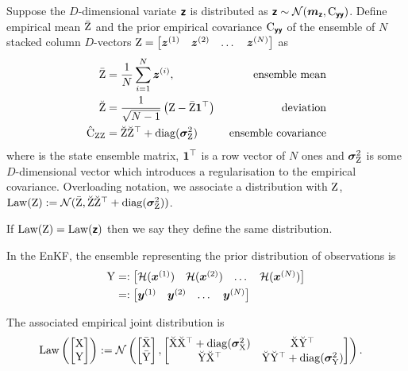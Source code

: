\documentclass{article}
\begin{document}
Suppose the $D$-dimensional variate $\boldsymbol{\mathsf{z}}$ is distributed as
$\boldsymbol{\mathsf{z}}\sim\mathcal{N}(\boldsymbol{m}_{\boldsymbol{\mathsf{z}}},\mathrm{C}_{\boldsymbol{\mathsf{yy}}})$.
Define empirical mean $\bar{\mathrm{Z}}$ and the prior empirical covariance $\mathrm{C}_{\boldsymbol{\mathsf{yy}}}$ of the ensemble of $N$ stacked column $D$-vectors  $\mathrm{Z} = \begin{bmatrix}\boldsymbol{z}^{(1)}& \boldsymbol{z}^{(2)}& \dots& \boldsymbol{z}^{(N)}\end{bmatrix}$ as
\begin{align}
    \bar{\mathrm{Z}} &= \frac{1}{N} \sum_{i=1}^N \boldsymbol{z}^{(i)}, \label{eq:ensemble_mean} & \text{ ensemble mean} \\
    \breve{\mathrm{Z}} &= \frac{1}{\sqrt{N-1}} \left( \mathrm{Z} - \bar{\mathrm{Z}} \boldsymbol{1}^\top \right) &\text{ deviation}  \label{eq:deviation_matrix} \\
    \hat{\mathrm{C}}_{\mathrm{ZZ}} &= \breve{\mathrm{Z}} \breve{\mathrm{Z}}^\top + \operatorname{diag}(\boldsymbol{\sigma}_{\mathrm{Z}}^2)&\text{ ensemble covariance}  \label{eq:ensemble-covariance}
\end{align}
where is the state ensemble matrix, $\boldsymbol{1}^\top$ is a row vector of $N$ ones and $\boldsymbol{\sigma}_{\mathrm{Z}}^2$ is some $D$-dimensional vector which introduces a regularisation to the empirical covariance.
Overloading notation, we associate a distribution with $\mathrm{Z}$,
$\operatorname{Law}(\mathrm{Z}) := \mathcal{N}(\bar{\mathrm{Z}}, \breve{\mathrm{Z}} \breve{\mathrm{Z}}^\top + \operatorname{diag}(\boldsymbol{\sigma}_{\mathrm{Z}}^2))$.

If $\operatorname{Law}(\mathrm{Z})=\operatorname{Law}(\boldsymbol{\mathsf{z}})$ then we say they define the same distribution.

In the EnKF, the ensemble representing the prior distribution of observations is
\begin{align}
    \mathrm{Y} &=: \begin{bmatrix}\mathcal{H}(\boldsymbol{x}^{(1)}) & \mathcal{H}(\boldsymbol{x}^{(2)})& \dots& \mathcal{H}(\boldsymbol{x}^{(N)})\end{bmatrix}\\
    &=: \begin{bmatrix}\boldsymbol{y}^{(1)}& \boldsymbol{y}^{(2)}& \dots& \boldsymbol{y}^{(N)}\end{bmatrix}
\end{align}


The associated empirical joint distribution is
\begin{align}
    \operatorname{Law}\left(\begin{bmatrix}
        \mathrm{X}\\
        \mathrm{Y}
    \end{bmatrix}\right) &:= \mathcal{N}\left(\begin{bmatrix}
        \bar{\mathrm{X}}\\
        \bar{\mathrm{Y}}
    \end{bmatrix},
    \begin{bmatrix}
        \breve{\mathrm{X}} \breve{\mathrm{X}}^\top + \operatorname{diag}(\boldsymbol{\sigma}_{\mathrm{X}}^2) & \breve{\mathrm{X}} \breve{\mathrm{Y}}^\top \\
        \breve{\mathrm{Y}} \breve{\mathrm{X}}^\top  & \breve{\mathrm{Y}} \breve{\mathrm{Y}}^\top + \operatorname{diag}(\boldsymbol{\sigma}_{\mathrm{Y}}^2)
    \end{bmatrix}
    \right).
\end{align}
\end{document}
